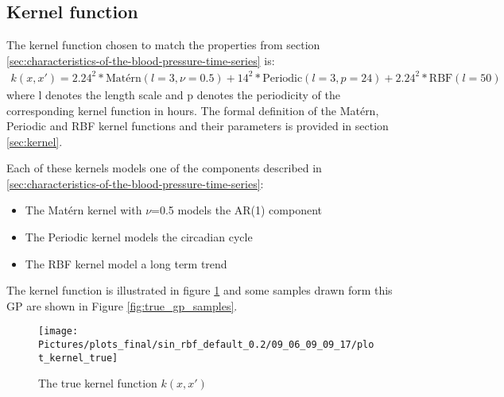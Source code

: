 \subsection{Kernel function}
The kernel function chosen to match the properties from
section \ref{sec:characteristics-of-the-blood-pressure-time-series} is:
\begin{gather*}\label{def:true_gp}
k(x, x') = 2.24^{2} * \text{Matérn}(l=3, \nu=0.5) +
14^{2} * \text{Periodic}(l=3, p=24) +  2.24^{2} * \text{RBF}(l=50)
\end{gather*}
where l denotes the length scale and p denotes the periodicity
of the corresponding kernel function in hours.
The formal definition of the Matérn, Periodic and RBF kernel
functions and their parameters is provided in section \ref{sec:kernel}.

Each of these kernels models one of the components described in
\ref{sec:characteristics-of-the-blood-pressure-time-series}:
\begin{itemize}
    \item The Matérn kernel with $\nu$=0.5 models the AR(1) component
    \item The Periodic kernel models the circadian cycle
    \item The RBF kernel model a long term trend
\end{itemize}

The kernel function is illustrated in figure \ref{fig:true_kernel} and
some samples drawn form this GP are shown in Figure \ref{fig:true_gp_samples}.

\begin{figure}[!ht]
    \centering
    \texttt{[image: Pictures/plots\_final/sin\_rbf\_default\_0.2/09\_06\_09\_09\_17/plot\_kernel\_true]}
    \caption{The true kernel function $k(x,x')$}
    \label{fig:true_kernel}
\end{figure}

